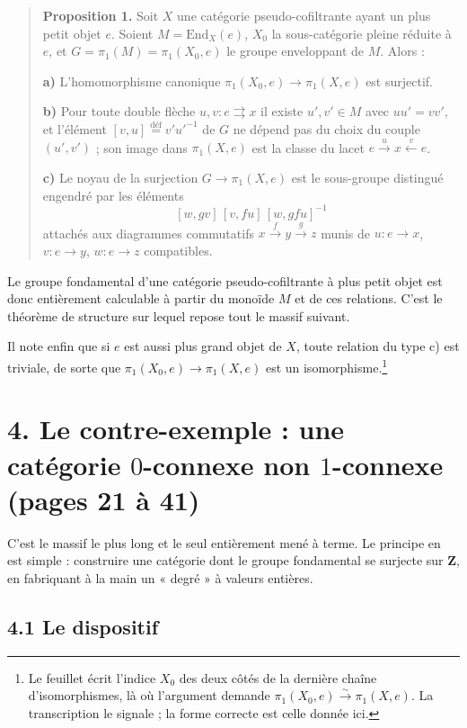 \documentclass[11pt,a4paper]{article}
\begin{document}
\begin{quote}
\textbf{Proposition 1.} Soit $X$ une catégorie pseudo-cofiltrante ayant un
plus petit objet $e$. Soient $M = \mathrm{End}_{X}(e)$, $X_{0}$ la
sous-catégorie pleine réduite à $e$, et $G = \pi_{1}(M) = \pi_{1}(X_{0}, e)$
le groupe enveloppant de $M$. Alors :

\textbf{a)} L'homomorphisme canonique $\pi_{1}(X_{0}, e) \to \pi_{1}(X,e)$ est
surjectif.

\textbf{b)} Pour toute double flèche $u, v : e \rightrightarrows x$ il existe
$u', v' \in M$ avec $uu' = vv'$, et l'élément
$[v,u] \overset{\text{déf}}{=} v'u'^{-1}$ de $G$ ne dépend pas du choix du
couple $(u',v')$ ; son image dans $\pi_{1}(X,e)$ est la classe du lacet
$e \xrightarrow{u} x \xleftarrow{v} e$.

\textbf{c)} Le noyau de la surjection $G \to \pi_{1}(X,e)$ est le sous-groupe
distingué engendré par les éléments
\[
  [w, gv]\,[v, fu]\,[w, gfu]^{-1}
\]
attachés aux diagrammes commutatifs
$x \xrightarrow{f} y \xrightarrow{g} z$ munis de $u : e \to x$, $v : e \to y$,
$w : e \to z$ compatibles.
\end{quote}

Le groupe fondamental d'une catégorie pseudo-cofiltrante à plus petit objet
est donc entièrement calculable à partir du monoïde $M$ et de ces relations.
C'est le théorème de structure sur lequel repose tout le massif suivant.

Il note enfin que si $e$ est aussi plus grand objet de $X$, toute relation du
type c) est triviale, de sorte que
$\pi_1(X_{0},e) \to \pi_{1}(X,e)$ est un isomorphisme.\footnote{Le feuillet
écrit l'indice $X_{0}$ des deux côtés de la dernière chaîne d'isomorphismes,
là où l'argument demande $\pi_{1}(X_{0},e) \xrightarrow{\sim} \pi_{1}(X,e)$.
La transcription le signale ; la forme correcte est celle donnée ici.}

\section*{4. Le contre-exemple : une catégorie $0$-connexe non $1$-connexe (pages 21 à 41)}

C'est le massif le plus long et le seul entièrement mené à terme. Le principe
en est simple : construire une catégorie dont le groupe fondamental se
surjecte sur $\mathbf{Z}$, en fabriquant à la main un « degré » à valeurs
entières.

\subsection*{4.1 Le dispositif}
\end{document}
